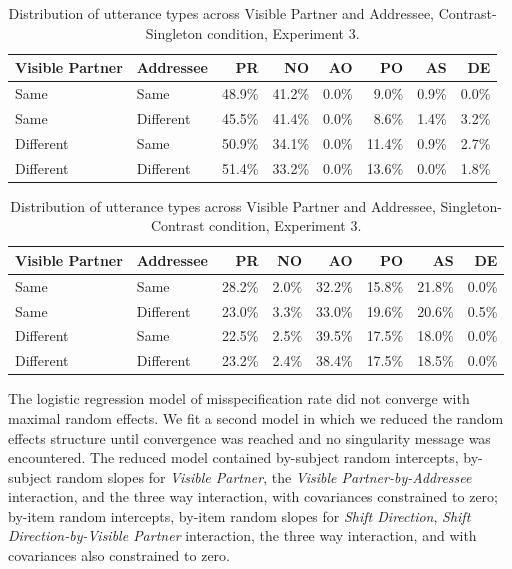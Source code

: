 \documentclass[natbib,man,a4paper]{apa6}
\begin{document}
\begin{table}[ht]
\centering
\caption{Distribution of utterance types across Visible Partner and Addressee, Contrast-Singleton condition, Experiment 3.} 
\label{tbl:exp3-utt-dist}
\begin{tabular}{llrrrrrr}
  \hline
Visible Partner & Addressee & PR & NO & AO & PO & AS & DE \\ 
  \hline
Same & Same & 48.9\% & 41.2\% & 0.0\% & 9.0\% & 0.9\% & 0.0\% \\ 
  Same & Different & 45.5\% & 41.4\% & 0.0\% & 8.6\% & 1.4\% & 3.2\% \\ 
  Different & Same & 50.9\% & 34.1\% & 0.0\% & 11.4\% & 0.9\% & 2.7\% \\ 
  Different & Different & 51.4\% & 33.2\% & 0.0\% & 13.6\% & 0.0\% & 1.8\% \\ 
   \hline
\end{tabular}
\end{table}

\begin{table}[ht]
\centering
\caption{Distribution of utterance types across Visible Partner and Addressee, Singleton-Contrast condition, Experiment 3.} 
\label{tbl:exp3-utt-dist}
\begin{tabular}{llrrrrrr}
  \hline
Visible Partner & Addressee & PR & NO & AO & PO & AS & DE \\ 
  \hline
Same & Same & 28.2\% & 2.0\% & 32.2\% & 15.8\% & 21.8\% & 0.0\% \\ 
  Same & Different & 23.0\% & 3.3\% & 33.0\% & 19.6\% & 20.6\% & 0.5\% \\ 
  Different & Same & 22.5\% & 2.5\% & 39.5\% & 17.5\% & 18.0\% & 0.0\% \\ 
  Different & Different & 23.2\% & 2.4\% & 38.4\% & 17.5\% & 18.5\% & 0.0\% \\ 
   \hline
\end{tabular}
\end{table}

The logistic regression model of misspecification rate did not converge with maximal random effects. We fit a second model in which we reduced the random effects structure until convergence was reached and no singularity message was encountered. The reduced model contained by-subject random intercepts, by-subject random slopes for \emph{Visible Partner}, the \emph{Visible Partner-by-Addressee} interaction, and the three way interaction, with covariances constrained to zero; by-item random intercepts, by-item random slopes for \emph{Shift Direction}, \emph{Shift Direction-by-Visible Partner} interaction, the three way interaction, and with covariances also constrained to zero.
\end{document}
